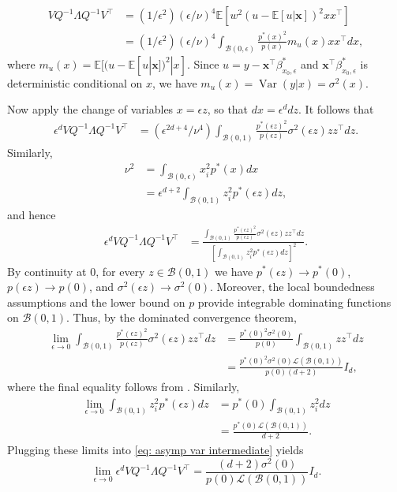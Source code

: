 \documentclass[11pt]{article}
\begin{document}
\begin{appendices}
\begin{align*}
    VQ^{-1}\Lambda Q^{-1}V^{\top}
    &= (1/\epsilon^2)(\epsilon/\nu)^{4}\mathbb{E}\left[w^2(u - \mathbb{E}[u|\boldsymbol{x}])^2xx^{\top}\right] \\
    &= (1/\epsilon^2)(\epsilon/\nu)^{4}\int_{\mathcal{B}(0, \epsilon)} \frac{p^*(x)^2}{p(x)}m_u(x)xx^{\top} dx,
\end{align*}
where $m_u(x) = \mathbb{E}[(u - \mathbb{E}[u|\boldsymbol{x}])^2|x]$. Since $u=y-\boldsymbol{x}^\top\beta^*_{x_0,\epsilon}$ and $\boldsymbol{x}^\top\beta^*_{x_0,\epsilon}$ is deterministic conditional on $x$, we have $m_u(x)=\operatorname{Var}(y|x)=\sigma^2(x)$.

Now apply the change of variables $x=\epsilon z$, so that $dx=\epsilon^d dz$. It follows that
\begin{align*}
    \epsilon^dVQ^{-1}\Lambda Q^{-1}V^{\top}
    &= (\epsilon^{2d+4}/\nu^{4})\int_{\mathcal{B}(0, 1)} \frac{p^*(\epsilon z)^2}{p(\epsilon z)}\sigma^2(\epsilon z)zz^{\top} dz.
\end{align*}
Similarly,
\begin{align*}
    \nu^2 &= \int_{\mathcal{B}(0, \epsilon)}x_i^2 p^*(x)dx \\
    &= \epsilon^{d+2} \int_{\mathcal{B}(0, 1)}z_i^2p^*(\epsilon z) dz,
\end{align*}
and hence
\begin{align}
    \epsilon^dVQ^{-1}\Lambda Q^{-1}V^{\top}
    &= \frac{\int_{\mathcal{B}(0, 1)} \frac{p^*(\epsilon z)^2}{p(\epsilon z)}\sigma^2(\epsilon z)zz^{\top} dz}{\left[\int_{\mathcal{B}(0, 1)}z_i^2p^*(\epsilon z) dz\right]^2}. \label{eq: asymp var intermediate}
\end{align}
By continuity at $0$, for every $z\in\mathcal{B}(0,1)$ we have $p^*(\epsilon z)\rightarrow p^*(0)$, $p(\epsilon z)\rightarrow p(0)$, and $\sigma^2(\epsilon z)\rightarrow\sigma^2(0)$. Moreover, the local boundedness assumptions and the lower bound on $p$ provide integrable dominating functions on $\mathcal{B}(0,1)$. Thus, by the dominated convergence theorem,
\begin{align*}
    \lim_{\epsilon\rightarrow0}\int_{\mathcal{B}(0,1)}
    \frac{p^*(\epsilon z)^2}{p(\epsilon z)}
    \sigma^2(\epsilon z)zz^\top dz
    &=
    \frac{p^*(0)^2\sigma^2(0)}{p(0)}
    \int_{\mathcal{B}(0,1)}zz^\top dz \\
    &=
    \frac{p^*(0)^2\sigma^2(0)\mathcal{L}(\mathcal{B}(0,1))}{p(0)(d+2)}I_d,
\end{align*}
where the final equality follows from . Similarly,
\begin{align*}
    \lim_{\epsilon\rightarrow0}\int_{\mathcal{B}(0,1)}
    z_i^2p^*(\epsilon z)dz
    &=
    p^*(0)\int_{\mathcal{B}(0,1)}z_i^2dz \\
    &=
    \frac{p^*(0)\mathcal{L}(\mathcal{B}(0,1))}{d+2}.
\end{align*}
Plugging these limits into \cref{eq: asymp var intermediate} yields
\[
\lim_{\epsilon \rightarrow 0}\epsilon^dVQ^{-1}\Lambda Q^{-1}V^{\top}
=
\frac{(d+2)\sigma^2(0)}
{p(0)\mathcal{L}(\mathcal{B}(0,1))}I_d.
\]


\end{appendices}
\end{document}
